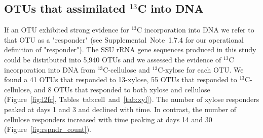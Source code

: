 \subsection{OTUs that assimilated $^{13}$C into DNA} \label{responders}
If an OTU exhibited strong evidence for $^{13}$C incorporation into DNA we
refer to that OTU as a "responder" (see Supplemental Note 1.7.4 for our
operational definition of "responder"). The SSU rRNA gene sequences produced in
this study could be distributed into 5,940 OTUs and we assessed the evidence of
$^{13}$C incorporation into DNA from $^{13}$C-cellulose and $^{13}$C-xylose for
each OTU. We found a 41 OTUs that responded to 13-xylose, 55 OTUs that
responded to $^{13}$C-cellulose, and 8 OTUs that responded to both xylose and
cellulose (Figure~\ref{fig:l2fc}, Tables~{tab:cell}~and~\ref{tab:xyl}). The
number of xylose responders peaked at days 1 and 3 and declined with time. In
contrast, the number of cellulose responders increased with time peaking at
days 14 and 30 (Figure~\ref{fig:rspndr_count}). 


